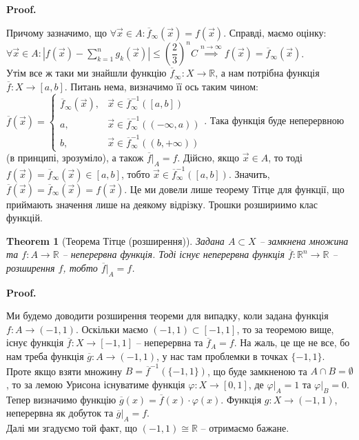 \documentclass[a4paper, 10pt]{article}
\makeatletter
\def\qed{$\blacksquare$}
\theoremstyle{theoremdd}
\newtheorem{theorem}{Theorem}[subsection]
\theoremstyle{theoremdd}
\theoremstyle{theoremdd}
\theoremstyle{theoremdd}
\theoremstyle{theoremdd}
\theoremstyle{theoremdd}
\theoremstyle{theoremdd}
\theoremstyle{theoremdd}
\theoremstyle{theoremdd}
\theoremstyle{theoremdd}
\theoremstyle{theoremdd}
\theoremstyle{theoremdd}
\theoremstyle{theoremdd}
\theoremstyle{theoremdd}
\theoremstyle{theoremdd}
\renewenvironment{proof}[1][Proof.\\]{\par
\pushQED{\hfill \qed}%
\normalfont \topsep6\p@\@plus6\p@\relax
\trivlist
\item\relax
{\bfseries
#1\@addpunct{.}}\hspace\labelsep\ignorespaces
}{%
\popQED\endtrivlist\@endpefalse
}
\makeatother
\begin{document}
\begin{proof}
Причому зазначимо, що $\forall \vec{x} \in A: \overline{f}_\infty(\vec{x}) = f(\vec{x})$. Справді, маємо оцінку:\\
$\forall \vec{x} \in A: \displaystyle\left| f(\vec{x}) - \sum_{k=1}^n g_k(\vec{x}) \right| \leq \left(\dfrac{2}{3}\right)^n C \overset{n \to \infty}{\implies} f(\vec{x}) = \overline{f}_\infty(\vec{x})$.\\
Утім все ж таки ми знайшли функцію $\overline{f}_\infty \colon X \to \mathbb{R}$, а нам потрібна функція $\overline{f} \colon X \to [a,b]$. Питань нема, визначимо її ось таким чином: $\overline{f}(\vec{x}) = \begin{cases} \overline{f}_\infty(\vec{x}), & \vec{x} \in \overline{f}_\infty^{-1}([a,b]) \\ a, & \vec{x} \in \overline{f}_\infty^{-1}((-\infty,a)) \\ b, & \vec{x} \in \overline{f}_\infty^{-1}((b,+\infty)) \end{cases}$. Така функція буде неперервною (в принципі, зрозуміло), а також $\overline{f}|_A = f$. Дійсно, якщо $\vec{x} \in A$, то тоді $f(\vec{x}) = \overline{f}_\infty(\vec{x}) \in [a,b]$, тобто $\vec{x} \in \overline{f}_\infty^{-1}([a,b])$. Значить, $\overline{f}(\vec{x}) = \overline{f}_\infty(\vec{x}) = f(\vec{x})$.
\end{proof}
\noindent
Це ми довели лише теорему Тітце для функції, що приймають значення лише на деякому відрізку. Трошки розшириимо клас функцій.

\begin{theorem}[Теорема Тітце (розширення)]
Задана $A \subset X$ -- замкнена множина та $f \colon A \to \mathbb{R}$ -- неперервна функція. Тоді існує неперервна функція $\overline{f} \colon \mathbb{R}^n \to \mathbb{R}$ -- розширення $f$, тобто $\overline{f}|_{A} = f$.
\end{theorem}

\begin{proof}
Ми будемо доводити розширення теореми для випадку, коли задана функція $f \colon A \to (-1,1)$. Оскільки маємо $(-1,1) \subset [-1,1]$, то за теоремою вище, існує функція $\overline{f} \colon X \to [-1,1]$ -- неперервна та $\overline{f}_A = f$. На жаль, це ще не все, бо нам треба функція $\overline{g} \colon A \to (-1,1)$, у нас там проблемки в точках $\{-1,1\}$.\\
Проте якщо взяти множину $B = \overline{f}^{-1}(\{-1,1\})$, що буде замкненою та $A \cap B = \emptyset$, то за лемою Урисона існуватиме функція $\varphi \colon X \to [0,1]$, де $\varphi|_A = 1$ та $\varphi|_B = 0$. Тепер визначимо функцію $\overline{g}(x) = \overline{f}(x) \cdot \varphi(x)$. Функція $g \colon X \to (-1,1)$, неперервна як добуток та $\overline{g}|_A = f$.\\
Далі ми згадуємо той факт, що $(-1,1) \cong \mathbb{R}$ -- отримаємо бажане.
\end{proof}
\newpage
\fi
\end{document}
